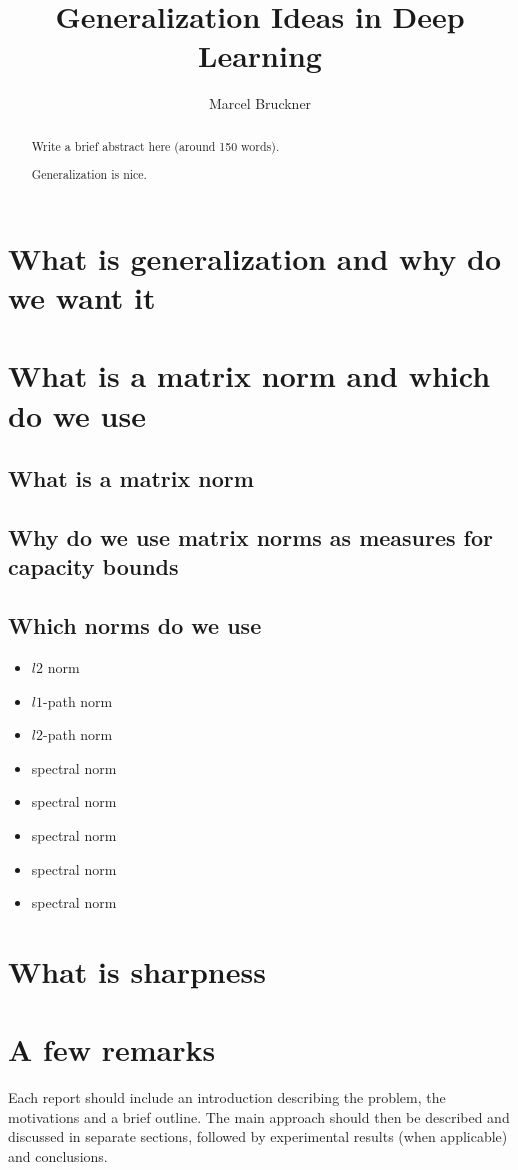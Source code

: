 \documentclass[a4paper,10pt]{article}
\title{Generalization Ideas in Deep Learning} %
\author{Marcel Bruckner} %
\institute{\textit{Seminar: Optimization and Generalization in Deep Learning}}
\begin{document}
\maketitle

\begin{abstract}
Write a brief abstract here (around 150 words).

Generalization is nice.
\end{abstract}

\section{What is generalization and why do we want it}

\section{What is a matrix norm and which do we use}
\subsection{What is a matrix norm}
\subsection{Why do we use matrix norms as measures for capacity bounds}
\subsection{Which norms do we use}
\begin{itemize}
    \item $l2$ norm
    \item $l1$-path norm
    \item $l2$-path norm
    \item spectral norm
    \item spectral norm
    \item spectral norm
    \item spectral norm
    \item spectral norm
\end{itemize}

\section{What is sharpness}
\newpage

\section{A few remarks}
Each report should include an introduction describing the problem, the motivations and a brief outline. The main approach should then be described and discussed in separate sections, followed by experimental results (when applicable) and conclusions.
\end{document}
